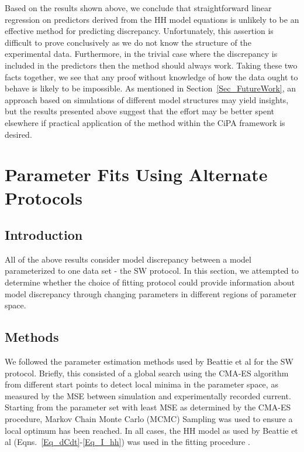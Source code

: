 \documentclass[11pt,a4paper,oneside]{article}
\begin{document}
Based on the results shown above, we conclude that straightforward linear regression on predictors derived from the HH model equations is unlikely to be an effective method for predicting discrepancy. Unfortunately, this assertion is difficult to prove conclusively as we do not know the structure of the experimental data. Furthermore, in the trivial case where the discrepancy is included in the predictors then the method should always work. Taking these two facts together, we see that any proof without knowledge of how the data ought to behave is likely to be impossible. As mentioned in Section~\ref{Sec_FutureWork}, an approach based on simulations of different model structures may yield insights, but the results presented above suggest that the effort may be better spent elsewhere if practical application of the method within the CiPA framework is desired. 

\section{Parameter Fits Using Alternate Protocols}\label{Sec_AltProtocols}

\subsection{Introduction}
All of the above results consider model discrepancy between a model parameterized to one data set - the SW protocol. In this section, we attempted to determine whether the choice of fitting protocol could provide information about model discrepancy through changing parameters in different regions of parameter space.

\subsection{Methods}
We followed the parameter estimation methods used by Beattie et al for the SW protocol. Briefly, this consisted of a global search using the CMA-ES algorithm from different start points to detect local minima in the parameter space, as measured by the MSE between simulation and experimentally recorded current. Starting from the parameter set with least MSE as determined by the CMA-ES procedure, Markov Chain Monte Carlo (MCMC) Sampling was used to ensure a local optimum has been reached. In all cases, the HH model as used by Beattie et al (Eqns.~\eqref{Eq_dCdt}-\eqref{Eq_I_hh}) was used in the fitting procedure \cite{Beattie2018}.
\end{document}
